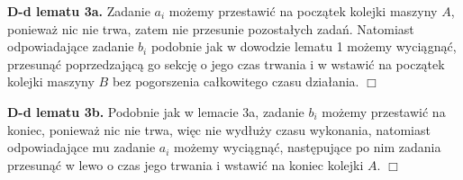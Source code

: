 \documentclass[11pt, wide]{article}
\begin{document}
    \textbf{D-d lematu 3a.}
    Zadanie $a_i$ możemy przestawić na początek kolejki maszyny $A$, ponieważ nic nie trwa, zatem nie
    przesunie pozostałych zadań. Natomiast odpowiadające zadanie $b_i$
    podobnie jak w dowodzie lematu 1 możemy wyciągnąć, przesunąć poprzedzającą go sekcję o jego czas trwania
    i w wstawić na początek kolejki maszyny $B$ bez pogorszenia całkowitego czasu działania.
    \hspace*{12cm} $\Box$

    \textbf{D-d lematu 3b.}
    Podobnie jak w lemacie 3a, zadanie $b_i$ możemy przestawić na koniec, ponieważ nic nie trwa, więc nie wydłuży czasu wykonania,
    natomiast odpowiadające mu zadanie $a_i$ możemy wyciągnąć, następujące po nim zadania przesunąć w lewo o czas jego trwania i 
    wstawić na koniec kolejki $A$.
    \hspace*{12cm} $\Box$

    
\end{document}
